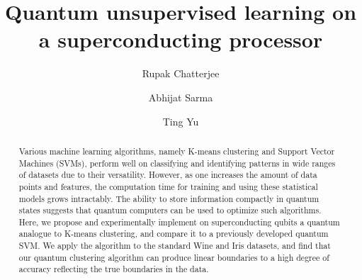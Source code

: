 \documentclass[twocolumn, english]{revtex4-2}
\begin{document}
\title{Quantum unsupervised learning on a superconducting processor}
\author{Rupak Chatterjee}
\author{Abhijat Sarma}
\author{Ting Yu}
\begin{abstract}
Various machine learning algorithms, namely K-means clustering and Support Vector Machines (SVMs), perform well on classifying and identifying patterns in wide ranges of datasets due to their versatility. However, as one increases the amount of data points and features, the computation time for training and using these statistical models grows intractably. The ability to store information compactly in quantum states suggests that quantum computers can be used to optimize such algorithms. Here, we propose and experimentally implement on superconducting qubits a quantum analogue to K-means clustering, and compare it to a previously developed quantum SVM. We apply the algorithm to the standard Wine and Iris datasets, and find that our quantum clustering algorithm can produce linear boundaries to a high degree of accuracy reflecting the true boundaries in the data.
\end{abstract}
\maketitle
\end{document}
